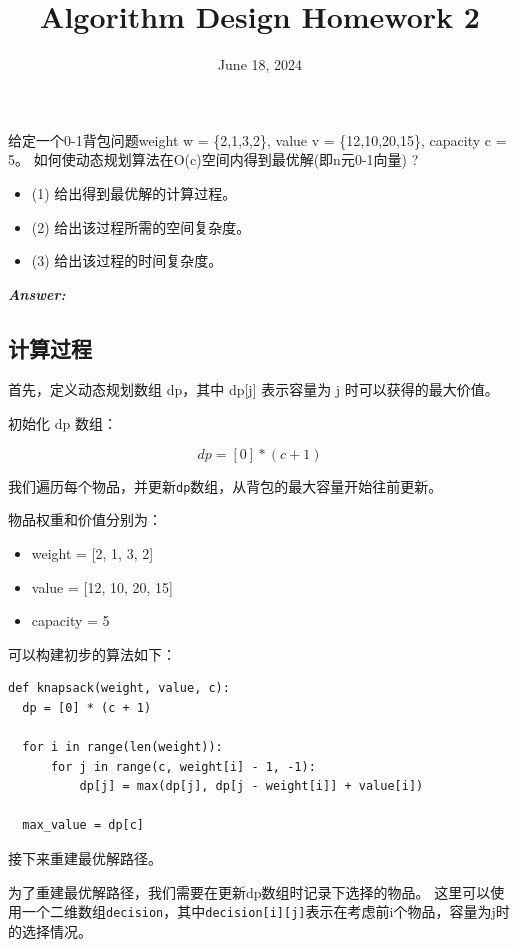 \documentclass[12pt]{article}
\title{\textbf{Algorithm Design Homework 2}}
\date{June 18, 2024}
\newenvironment{Answer}{
  \vspace{12pt}
  {\large\textbf{\textit{\hspace{-12pt}Answer:}}}\par
  \vspace{8pt}
} {\vspace{24pt}}
\begin{document}
\maketitle

\begin{question}{}{}
给定一个0-1背包问题weight w = \{2,1,3,2\}, value v = \{12,10,20,15\}, capacity c = 5。
如何使动态规划算法在O(c)空间内得到最优解(即n元0-1向量) ?
\begin{itemize}
  \item (1) 给出得到最优解的计算过程。
  \item (2) 给出该过程所需的空间复杂度。
  \item (3) 给出该过程的时间复杂度。
\end{itemize}
\end{question}
\begin{Answer}
\subsection*{计算过程}
\noindent

首先，定义动态规划数组 dp，其中 dp[j] 表示容量为 j 时可以获得的最大价值。

初始化 dp 数组：

$$dp=[0]*(c + 1)$$

我们遍历每个物品，并更新\texttt{dp}数组，从背包的最大容量开始往前更新。

物品权重和价值分别为：
\begin{itemize}
  \item weight = [2, 1, 3, 2]
  \item value = [12, 10, 20, 15]
  \item capacity = 5
\end{itemize}

可以构建初步的算法如下：

\begin{lstlisting}
def knapsack(weight, value, c):
  dp = [0] * (c + 1)

  for i in range(len(weight)):
      for j in range(c, weight[i] - 1, -1):
          dp[j] = max(dp[j], dp[j - weight[i]] + value[i])

  max_value = dp[c]
\end{lstlisting}

接下来重建最优解路径。

为了重建最优解路径，我们需要在更新dp数组时记录下选择的物品。
这里可以使用一个二维数组\texttt{decision}，其中\texttt{decision[i][j]}表示在考虑前i个物品，容量为j时的选择情况。


\end{Answer}
\end{document}
